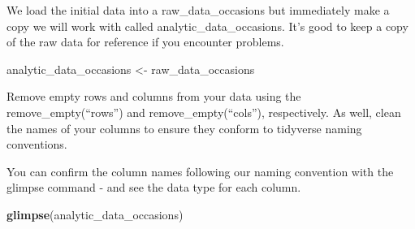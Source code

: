 \documentclass[
]{krantz}
\makeatletter
\newenvironment{Shaded}{\begin{snugshade}}{\end{snugshade}}
\newcommand{\CommentTok}[1]{\textcolor[rgb]{0.37,0.37,0.37}{\textit{#1}}}
\newcommand{\KeywordTok}[1]{\textcolor[rgb]{0.27,0.27,0.27}{\textbf{#1}}}
\newcommand{\NormalTok}[1]{#1}
\newcommand{\OperatorTok}[1]{\textcolor[rgb]{0.43,0.43,0.43}{\textbf{#1}}}
\newcommand{\StringTok}[1]{\textcolor[rgb]{0.5,0.5,0.5}{#1}}
\newenvironment{kframe}{%
\medskip{}
\setlength{\fboxsep}{.8em}
 \def\at@end@of@kframe{}%
 \ifinner\ifhmode%
  \def\at@end@of@kframe{\end{minipage}}%
  \begin{minipage}{\columnwidth}%
 \fi\fi%
 \def\FrameCommand##1{\hskip\@totalleftmargin \hskip-\fboxsep
 \colorbox{shadecolor}{##1}\hskip-\fboxsep
     \hskip-\linewidth \hskip-\@totalleftmargin \hskip\columnwidth}%
 \MakeFramed {\advance\hsize-\width
   \@totalleftmargin\z@ \linewidth\hsize
   \@setminipage}}%
 {\par\unskip\endMakeFramed%
 \at@end@of@kframe}
\renewenvironment{Shaded}{\begin{kframe}}{\end{kframe}}
\makeatother
\begin{document}
We load the initial data into a raw\_data\_occasions but immediately make a copy we will work with called analytic\_data\_occasions. It's good to keep a copy of the raw data for reference if you encounter problems.

\begin{Shaded}
\begin{Highlighting}[]
\NormalTok{analytic_data_occasions <-}\StringTok{ }\NormalTok{raw_data_occasions}
\end{Highlighting}
\end{Shaded}

Remove empty rows and columns from your data using the remove\_empty(``rows'') and remove\_empty(``cols''), respectively. As well, clean the names of your columns to ensure they conform to tidyverse naming conventions.

\begin{Shaded}
\end{Shaded}

You can confirm the column names following our naming convention with the glimpse command - and see the data type for each column.

\begin{Shaded}
\begin{Highlighting}[]
\KeywordTok{glimpse}\NormalTok{(analytic_data_occasions)}
\end{Highlighting}
\end{Shaded}
\end{document}
